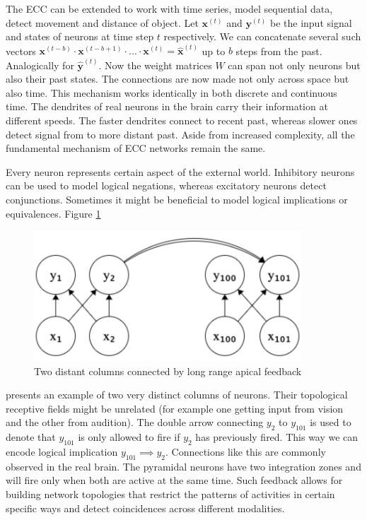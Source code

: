 \documentclass[12pt]{article}
\begin{document}
The ECC can be extended to work with time series, model sequential data, detect movement and distance of object. Let $\boldsymbol{x}^{(t)}$ and $\boldsymbol{y}^{(t)}$ be the input signal and states of neurons at time step $t$ respectively. We can concatenate several such vectors $\boldsymbol{x}^{(t-b)}\cdot \boldsymbol{x}^{(t-b+1) }\cdot ...\cdot\boldsymbol{x}^{(t)}=\boldsymbol{\hat{x}}^{(t)}$ up to $b$ steps from the past. Analogically for $\boldsymbol{\hat{y}}^{(t)}$. Now the weight matrices $W$ can span not only neurons but also their past states. The connections are now made not only across space but also time. This mechanism works identically in both discrete and continuous time. The dendrites of real neurons in the brain carry their information at different speeds. The faster dendrites connect to recent past, whereas slower ones detect signal from to more distant past. Aside from increased complexity, all the fundamental mechanism of ECC networks remain the same.

Every neuron represents certain aspect of the external world. Inhibitory neurons can be used to model logical negations, whereas excitatory neurons detect conjunctions. Sometimes it might be beneficial to model logical implications or equivalences. Figure \ref{fig:implication} 
\begin{figure}[!htbp]
	\centering
	\includegraphics[width=10cm]{implication}
	\caption{Two distant columns connected by long range apical feedback}
	\label{fig:implication}
\end{figure} 
presents an example of two very distinct columns of neurons. Their topological receptive fields might be unrelated (for example one getting input from vision and the other from audition). The double arrow connecting $y_2$ to $y_{101}$ is used to denote that $y_{101}$ is only allowed to fire if  $y_2$ has previously fired. This way we can encode logical implication $y_{101} \implies y_{2}$. Connections like this are commonly observed in the real brain. The pyramidal neurons have two integration zones and will fire only when both are active at the same time. Such feedback allows for building network topologies that restrict the patterns of activities in certain specific ways and detect coincidences across different modalities.
\end{document}
